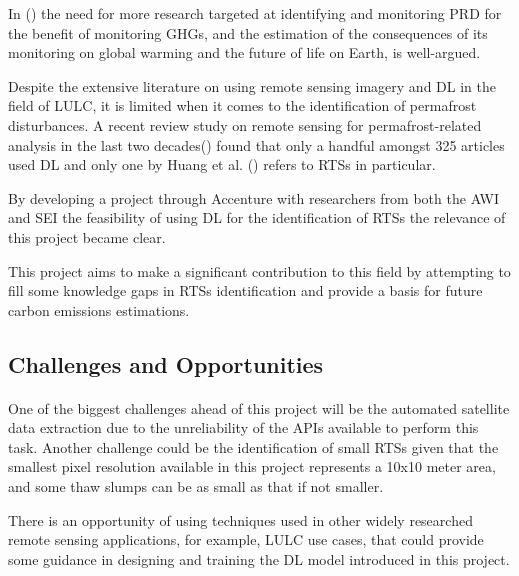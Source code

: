 In (\cite{monitoringperma}) the need for more research targeted at identifying and monitoring \gls{PRD} for the benefit of monitoring \gls{GHGs}, and the estimation of the consequences of its monitoring on global warming and the future of life on Earth, is well-argued.

Despite the extensive literature on using remote sensing imagery and \gls{DL} in the field of \gls{LULC}, it is limited when it comes to the identification of permafrost disturbances.
A recent review study on remote sensing for permafrost-related analysis in the last two decades(\cite{rs13061217}) found that only a handful amongst 325 articles used \gls{DL} and only one by Huang et al. (\cite{HUANG2020111534}) refers to \gls{RTS}s in particular. 

By developing a project through Accenture with researchers from both the \gls{AWI} and \gls{SEI} the feasibility of using DL for the identification of \gls{RTS}s the relevance of this project became clear.

This project aims to make a significant contribution to this field by attempting to fill some knowledge gaps in \gls{RTS}s identification and provide a basis for future carbon emissions estimations.

\subsection{Challenges and Opportunities} \label{challenges}
\paragraph{}
One of the biggest challenges ahead of this project will be the automated satellite data extraction due to the unreliability of the \gls{API}s available to perform this task. Another challenge could be the identification of small \gls{RTS}s given that the smallest pixel resolution available in this project represents a 10x10 meter area, and some thaw slumps can be as small as that if not smaller.

There is an opportunity of using techniques used in other widely researched remote sensing applications, for example, \gls{LULC} use cases, that could provide some guidance in designing and training the DL model introduced in this project.

